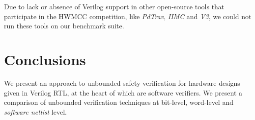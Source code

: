 Due to lack or absence of Verilog support in other open-source tools that
participate in the HWMCC competition, like \emph{PdTrav}, \emph{IIMC} and 
\emph{V3}, we could not run these tools on our benchmark suite. 


\section{Conclusions}
We present an approach to unbounded safety verification for hardware
designs given in Verilog RTL, at the heart of which are software
verifiers.  We present a comparison of unbounded verification
techniques at bit-level, word-level and \emph{software netlist} level.

